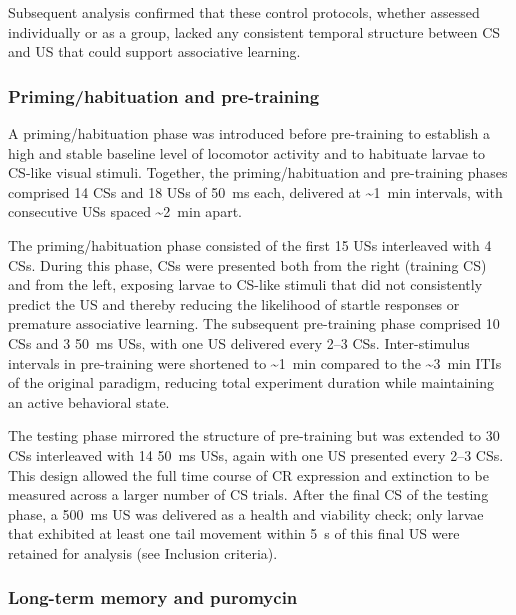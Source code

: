 Subsequent analysis confirmed that these control protocols, whether assessed individually or as a group, lacked any consistent temporal structure between CS and US that could support associative learning.

\subsubsection{Priming/habituation and pre-training}

A priming/habituation phase was introduced before pre-training to establish a high and stable baseline level of locomotor activity and to habituate larvae to CS-like visual stimuli. Together, the priming/habituation and pre-training phases comprised 14 CSs and 18 USs of \SI{50}{\milli\second} each, delivered at \textasciitilde\SI{1}{\minute} intervals, with consecutive USs spaced \textasciitilde\SI{2}{\minute} apart.

The priming/habituation phase consisted of the first 15 USs interleaved with 4 CSs. During this phase, CSs were presented both from the right (training CS) and from the left, exposing larvae to CS-like stimuli that did not consistently predict the US and thereby reducing the likelihood of startle responses or premature associative learning. The subsequent pre-training phase comprised 10 CSs and 3 \SI{50}{\milli\second} USs, with one US delivered every 2--3 CSs. Inter-stimulus intervals in pre-training were shortened to \textasciitilde\SI{1}{\minute} compared to the \textasciitilde\SI{3}{\minute} ITIs of the original paradigm, reducing total experiment duration while maintaining an active behavioral state.

The testing phase mirrored the structure of pre-training but was extended to 30 CSs interleaved with 14 \SI{50}{\milli\second} USs, again with one US presented every 2--3 CSs. This design allowed the full time course of CR expression and extinction to be measured across a larger number of CS trials. After the final CS of the testing phase, a \SI{500}{\milli\second} US was delivered as a health and viability check; only larvae that exhibited at least one tail movement within \SI{5}{\second} of this final US were retained for analysis (see Inclusion criteria).

\subsubsection{Long-term memory and puromycin}

